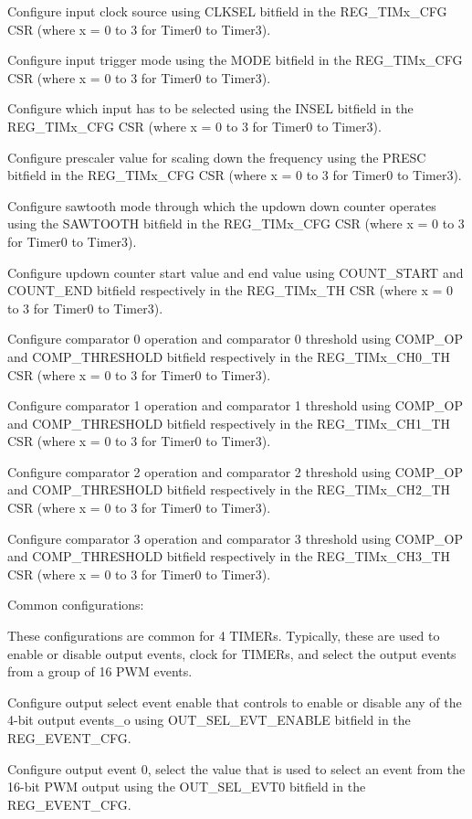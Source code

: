     Configure input clock source using CLKSEL bitfield in the REG_TIMx_CFG CSR (where x = 0 to 3 for Timer0 to Timer3).

    Configure input trigger mode using the MODE bitfield in the REG_TIMx_CFG CSR (where x = 0 to 3 for Timer0 to Timer3).

    Configure which input has to be selected using the INSEL bitfield in the REG_TIMx_CFG CSR (where x = 0 to 3 for Timer0 to Timer3).

    Configure prescaler value for scaling down the frequency using the PRESC bitfield in the REG_TIMx_CFG CSR (where x = 0 to 3 for Timer0 to Timer3).

    Configure sawtooth mode through which the updown down counter operates using the SAWTOOTH bitfield in the REG_TIMx_CFG CSR (where x = 0 to 3 for Timer0 to Timer3).

    Configure updown counter start value and end value using COUNT_START and COUNT_END bitfield respectively in the REG_TIMx_TH CSR (where x = 0 to 3 for Timer0 to Timer3).

    Configure comparator 0 operation and comparator 0 threshold using COMP_OP and COMP_THRESHOLD bitfield respectively in the REG_TIMx_CH0_TH CSR (where x = 0 to 3 for Timer0 to Timer3).

    Configure comparator 1 operation and comparator 1 threshold using COMP_OP and COMP_THRESHOLD bitfield respectively in the REG_TIMx_CH1_TH CSR (where x = 0 to 3 for Timer0 to Timer3).

    Configure comparator 2 operation and comparator 2 threshold using COMP_OP and COMP_THRESHOLD bitfield respectively in the REG_TIMx_CH2_TH CSR (where x = 0 to 3 for Timer0 to Timer3).

    Configure comparator 3 operation and comparator 3 threshold using COMP_OP and COMP_THRESHOLD bitfield respectively in the REG_TIMx_CH3_TH CSR (where x = 0 to 3 for Timer0 to Timer3).

Common configurations:

These configurations are common for 4 TIMERs. Typically, these are used to enable or disable output events, clock for TIMERs, and select the output events from a group of 16 PWM events.

    Configure output select event enable that controls to enable or disable any of the 4-bit output events_o using OUT_SEL_EVT_ENABLE bitfield in the REG_EVENT_CFG.

    Configure output event 0, select the value that is used to select an event from the 16-bit PWM output using the OUT_SEL_EVT0 bitfield in the REG_EVENT_CFG.

